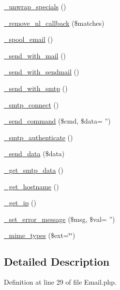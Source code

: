 \begin{DoxyCompactItemize}
\hyperlink{class_c_i___email_af50bcab235f0eff47d7117d77733f1d9}{\-\_\-unwrap\-\_\-specials} ()
\item 
\hyperlink{class_c_i___email_a3a624f07cca99fe6ab1b61dbec56eef8}{\-\_\-remove\-\_\-nl\-\_\-callback} (\$matches)
\item 
\hyperlink{class_c_i___email_a5d45a2f98c27332dfe78086c88eafd3c}{\-\_\-spool\-\_\-email} ()
\item 
\hyperlink{class_c_i___email_ae7e626556c4d619a7214bee6056badd4}{\-\_\-send\-\_\-with\-\_\-mail} ()
\item 
\hyperlink{class_c_i___email_a22ce9dc271da86e2a25041aa70e02502}{\-\_\-send\-\_\-with\-\_\-sendmail} ()
\item 
\hyperlink{class_c_i___email_a691e57a39f6f8956c5054fd7b109bb12}{\-\_\-send\-\_\-with\-\_\-smtp} ()
\item 
\hyperlink{class_c_i___email_ae57fde4883dcd1dec9f8999efef13f06}{\-\_\-smtp\-\_\-connect} ()
\item 
\hyperlink{class_c_i___email_a155a184147ad666ce5282c73f5a55fa1}{\-\_\-send\-\_\-command} (\$cmd, \$data= '')
\item 
\hyperlink{class_c_i___email_a708494a94d2083993ede37cf65a0c0fa}{\-\_\-smtp\-\_\-authenticate} ()
\item 
\hyperlink{class_c_i___email_a42fa768e8678b3c1462762b9b812a302}{\-\_\-send\-\_\-data} (\$data)
\item 
\hyperlink{class_c_i___email_ac421324c92e681315a1f2d0d7fa96a5b}{\-\_\-get\-\_\-smtp\-\_\-data} ()
\item 
\hyperlink{class_c_i___email_ad2d333b7bb9f6c25400714dd8931fe11}{\-\_\-get\-\_\-hostname} ()
\item 
\hyperlink{class_c_i___email_acecc14752ab2f9d104491d63d6c05f2e}{\-\_\-get\-\_\-ip} ()
\item 
\hyperlink{class_c_i___email_a5611627355586be39c5949ede1807c38}{\-\_\-set\-\_\-error\-\_\-message} (\$msg, \$val= '')
\item 
\hyperlink{class_c_i___email_a6a63a0201a038ff43fd91ed94654f907}{\-\_\-mime\-\_\-types} (\$ext=\char`\"{}\char`\"{})
\end{DoxyCompactItemize}


\subsection{Detailed Description}


Definition at line 29 of file Email.\-php.



